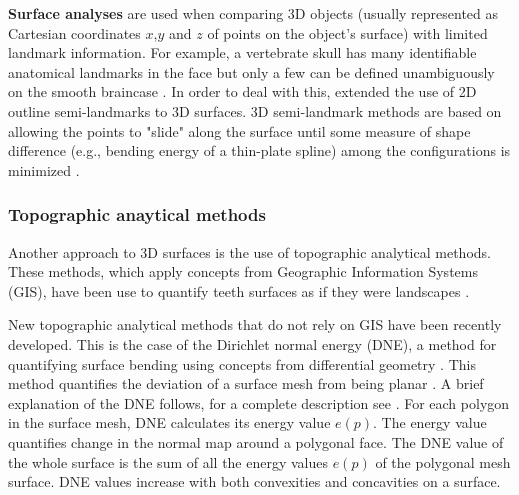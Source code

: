 \textbf{Surface analyses} are used when comparing 3D objects (usually represented as Cartesian coordinates $x$,$y$ and $z$ of points on the object's surface) with limited landmark information. For example, a vertebrate skull has many identifiable anatomical landmarks in the face but only a few can be defined unambiguously on the smooth braincase \citep{Mitteroecker2009}. In order to deal with this, \citealp{Gunz2005} extended the use of 2D outline semi-landmarks to 3D surfaces. 3D semi-landmark methods are based on allowing the points to "slide" along the surface until some measure of shape difference (e.g., bending energy of a thin-plate spline) among the configurations is minimized \citep{Mitteroecker2009}.


\subsubsection{Topographic anaytical methods}
\label{DNE_explanation}

Another approach to 3D surfaces is the use of topographic analytical methods. These methods, which apply concepts from Geographic Information Systems (GIS), have been use to quantify teeth surfaces as if they were landscapes \citep{jernvall1999laser,Winchester2014}.  

New topographic analytical methods that do not rely on GIS have been recently developed. This is the case of the Dirichlet normal energy (DNE), a method for quantifying surface bending using concepts from differential geometry \citep{Bunn2011}. This method quantifies the deviation of a surface mesh from being planar \citep{Bunn2011}. A brief explanation of the DNE follows, for a complete description see \citep{Bunn2011,Winchester2016}. For each polygon in the surface mesh, DNE calculates its energy value $e(p)$. The energy value quantifies change in the normal map around a polygonal face. The DNE value of the whole surface is the sum of all the energy values $e(p)$ of the polygonal mesh surface. DNE values increase with both convexities and concavities on a surface.

